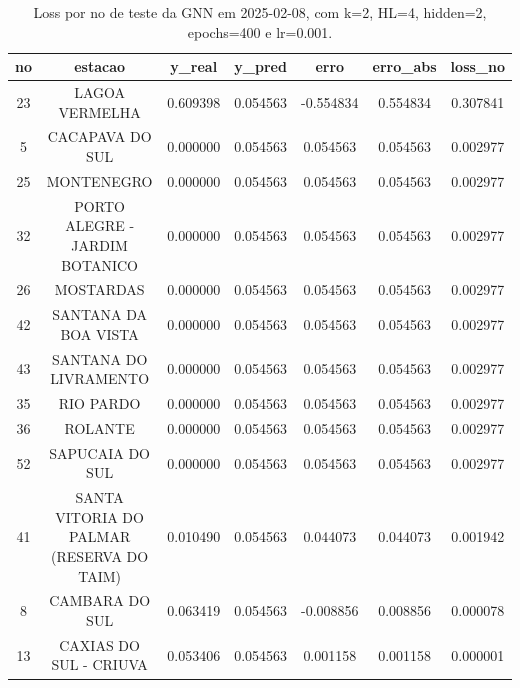 \begin{table}[h]
\centering
\caption{Loss por no de teste da GNN em 2025-02-08, com k=2, HL=4, hidden=2, epochs=400 e lr=0.001.}
\label{tab:gnn_loss_k2_hl4_h2_e400_d20250208}
\begin{tabular}{ccccccc}
\toprule
no & estacao & y\_real & y\_pred & erro & erro\_abs & loss\_no \\
\midrule
23 & LAGOA VERMELHA & 0.609398 & 0.054563 & -0.554834 & 0.554834 & 0.307841 \\
5 & CACAPAVA DO SUL & 0.000000 & 0.054563 & 0.054563 & 0.054563 & 0.002977 \\
25 & MONTENEGRO & 0.000000 & 0.054563 & 0.054563 & 0.054563 & 0.002977 \\
32 & PORTO ALEGRE - JARDIM BOTANICO & 0.000000 & 0.054563 & 0.054563 & 0.054563 & 0.002977 \\
26 & MOSTARDAS & 0.000000 & 0.054563 & 0.054563 & 0.054563 & 0.002977 \\
42 & SANTANA DA BOA VISTA & 0.000000 & 0.054563 & 0.054563 & 0.054563 & 0.002977 \\
43 & SANTANA DO LIVRAMENTO & 0.000000 & 0.054563 & 0.054563 & 0.054563 & 0.002977 \\
35 & RIO PARDO & 0.000000 & 0.054563 & 0.054563 & 0.054563 & 0.002977 \\
36 & ROLANTE & 0.000000 & 0.054563 & 0.054563 & 0.054563 & 0.002977 \\
52 & SAPUCAIA DO SUL & 0.000000 & 0.054563 & 0.054563 & 0.054563 & 0.002977 \\
41 & SANTA VITORIA DO PALMAR (RESERVA DO TAIM) & 0.010490 & 0.054563 & 0.044073 & 0.044073 & 0.001942 \\
8 & CAMBARA DO SUL & 0.063419 & 0.054563 & -0.008856 & 0.008856 & 0.000078 \\
13 & CAXIAS DO SUL - CRIUVA & 0.053406 & 0.054563 & 0.001158 & 0.001158 & 0.000001 \\
\bottomrule
\end{tabular}
\end{table}

